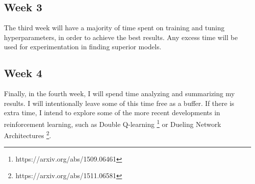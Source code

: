 \documentclass[preprint,12pt]{elsarticle}
\begin{document}
\subsection*{Week 3}

The third week will have a majority of time spent on training and tuning hyperparameters, in order to achieve the best results. Any excess time will be used for experimentation in finding superior models.

\subsection*{Week 4}

Finally, in the fourth week, I will spend time analyzing and summarizing my results. I will intentionally leave some of this time free as a buffer. If there is extra time, I intend to explore some of the more recent developments in reinforcement learning, such as Double Q-learning \footnote{https://arxiv.org/abs/1509.06461} or Dueling Network Architectures \footnote{https://arxiv.org/abs/1511.06581}.
\end{document}
